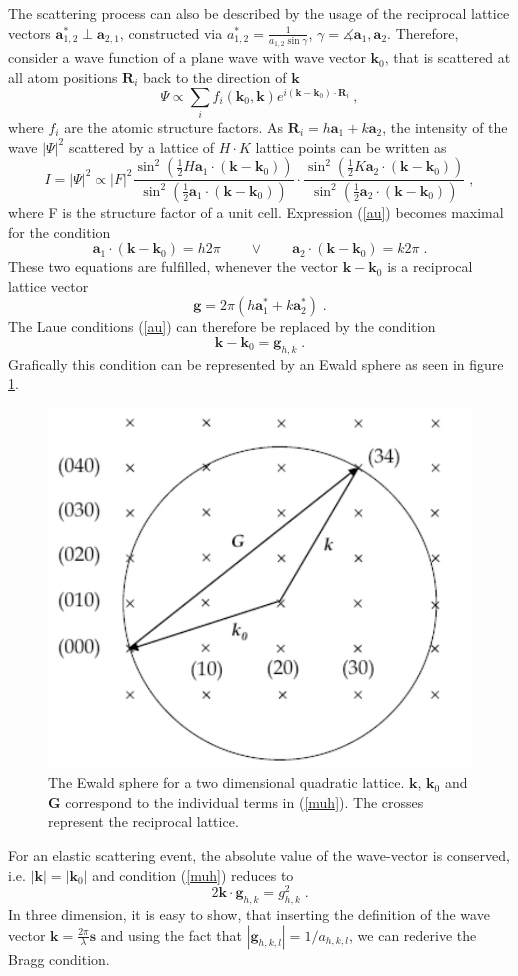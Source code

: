 \documentclass[a4paper]{scrartcl}
\numberwithin{equation}{section}
\numberwithin{figure}{section}
\numberwithin{table}{section}
\newcommand{\eq}[2]{\begin{equation}#1\label{#2}\end{equation}}
\newcommand{\Formel}[1]{(\ref{#1})}
\newcommand{\ve}[1]{\mathbf{ #1} }
\begin{document}
The scattering process can also be described by the usage of the reciprocal lattice vectors $\ve a_{1,2}^* \perp \ve a_{2,1}$, constructed via
$a_{1,2}^*=\frac{1}{a_{1,2} \sin \gamma} $, $\gamma = \measuredangle \ve a_1, \ve a_2 $. Therefore, consider a wave function of a plane wave with wave vector $\ve k_0$, that is scattered at all atom positions $\ve R_i$ back to the direction of $\ve k$ 
\eq{\Psi \propto \sum_{i} f_i(\ve k_0, \ve k) e^{i(\ve k - \ve k_0) \cdot \ve R_i} \ ,}{}
where $f_i$ are the atomic structure factors. As $\ve R_i=h \ve a_1 + k \ve a_2$, the intensity of the wave $|\Psi|^2$ scattered by a lattice of $H \cdot K$ lattice points can be written as \cite{kupp}
\eq{I=|\Psi|^2 \propto |F|^2 \frac{\sin^2 \left( \tfrac 1 2 H \ve a_1 \cdot (\ve k - \ve k_0) \right)}{\sin^2 \left( \tfrac 1 2 \ve a_1 \cdot ( \ve k - \ve k_0 ) \right)} \cdot \frac{\sin^2 \left( \tfrac 1 2 K \ve a_2 \cdot (\ve k - \ve k_0) \right)} {\sin^2 \left( \tfrac 1 2 \ve a_2 \cdot ( \ve k - \ve k_0 ) \right)} \; , } {au}
where F is the structure factor of a unit cell. Expression \Formel{au} becomes  maximal for the condition 
\eq{\ve a_1 \cdot (\ve k - \ve k_0) = h 2 \pi \qquad \vee \qquad \ve a_2 \cdot (\ve k - \ve k_0) = k 2 \pi \;.}{}
These two equations are fulfilled, whenever the vector $\ve k - \ve k_0$ is a reciprocal lattice vector
\eq{\ve g = 2 \pi (h \ve a_1^{*} + k \ve a_2^*) \; .}{}
The Laue conditions \Formel{au} can therefore be replaced by the condition
\eq{\ve k - \ve k_0 =\ve g_{h,k} \;.}{muh}
Grafically this condition can be represented by an Ewald sphere as seen in figure \ref{fig:ewald}.
\begin{figure}
  \centering
   	\includegraphics[width=0.5\linewidth]{pic/ewald.pdf}
 		\caption{ \small The Ewald sphere for a two dimensional quadratic lattice. $\ve k$, $\ve k_0$ and $\ve G$ correspond to the individual terms in \Formel{muh}. The crosses represent the reciprocal lattice.  }
      \label{fig:ewald}
\end{figure}
For an elastic scattering event, the absolute value of the wave-vector is conserved, i.e. $|\ve k|=|\ve k_0|$ and condition \Formel{muh} reduces to
\eq{2\ve k \cdot \ve g_{h,k} = g_{h,k}^2 \; .}{}
In three dimension, it is easy to show, that inserting the definition of the wave vector $\ve k=\frac{2\pi}{\lambda} \ve s$ and using the fact that $|\ve g_{h,k,l}| = 1/a_{h,k,l}$, we can rederive the Bragg condition. 
\end{document}
